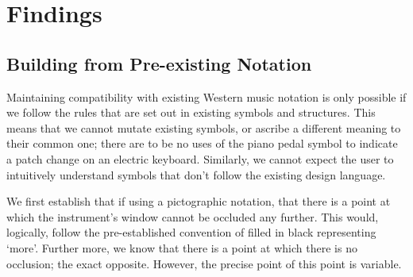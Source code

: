 \section{Findings}



\subsection{Building from Pre-existing Notation}

Maintaining compatibility with existing Western music notation is only possible if we follow the rules that are set out in existing symbols and structures.
This means that we cannot mutate existing symbols, or ascribe a different meaning to their common one; there are to be no uses of the piano pedal symbol to indicate a patch change on an electric keyboard.
Similarly, we cannot expect the user to intuitively understand symbols that don't follow the existing design language.

We first establish that if using a pictographic notation, that there is a point at which the instrument's window cannot be occluded any further. 
This would, logically, follow the pre-established convention of filled in black representing `more'. 
Further more, we know that there is a point at which there is no occlusion; the exact opposite. 
However, the precise point of this point is variable.

